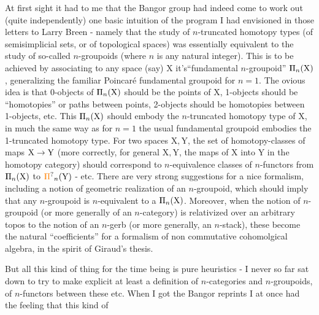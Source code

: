 At first sight it had  to me that the Bangor group had indeed come to work out (quite independently) one basic intuition of the program I had envisioned in those letters to Larry Breen - namely that the study of $n$-truncated homotopy types (of semisimplicial sets, or of topological spaces) was essentially equivalent to the study of so-called $n$-groupoids (where $n$ is any natural integer). This is  to be achieved by associating to any space (say) $\mathrm{X}$ it's``fundamental $n$-groupoid'' $\handwritten{\mathbb{\mathord{\rlap{\kern.23em\vrule height .66em width .035em}\mathrm{\Pi}}}}_{n}(\mathrm{X})$, generalizing the familiar Poincaré fundamental groupoid for $n=1$. The ovious idea is that 0-objects of $\handwritten{\mathbb{\mathord{\rlap{\kern.23em\vrule height .66em width .035em}\mathrm{\Pi}}}}_{n}(\mathrm{X})$ should be the points of $\mathrm{X}$, 1-objects should be ``homotopies'' or paths between points, 2-objects should be homotopies between 1-objects, etc.\unsure{-} This $\handwritten{\mathbb{\mathord{\rlap{\kern.23em\vrule height .66em width .035em}\mathrm{\Pi}}}}_{n}(\mathrm{X})$ should embody the $n$-truncated homotopy type of $\mathrm{X}$, in much the same way as for $n=1$ the usual fundamental groupoid embodies the 1-truncated homotopy type. For two spaces $\mathrm{X},\mathrm{Y}$, the set of homotopy-classes of maps $\mathrm{X}\to\mathrm{Y}$ (more correctly, for general $\mathrm{X},\mathrm{Y}$, the maps of $\mathrm{X}$ into $\mathrm{Y}$ in the homotopy category) should correspond to $n$-equivalence classes of $n$-functors from $\handwritten{\mathbb{\mathord{\rlap{\kern.23em\vrule height .66em width .035em}\mathrm{\Pi}}}}_{n}(\mathrm{X})$ to $\handwritten{\unsure{\mathbb{\mathord{\rlap{\kern.23em\vrule height .66em width .035em}\mathrm{\Pi}}}}}_{n}(\mathrm{Y})$ - etc. There are very stro\unsure{-}ng suggestions for a nice formalism, including a notion of geometric realization of an $n$-groupoid, which should imply that any $n$-groupoid is $n$-equivalent to a $\handwritten{\mathbb{\mathord{\rlap{\kern.23em\vrule height .66em width .035em}\mathrm{\Pi}}}}_{n}(\mathrm{X})$. Moreover, when the notion of $n$-groupoid (or more generally of an $n$-category) is relativized over an arbitrary topos to the notion of an $n$-gerb (or more generally, an $n$-stack), these become the  natural ``coefficients'' for a formalism of non commutative cohomolgical algebra, in the spirit of Giraud's thesis.

But all this kind of thing for the time being is pure heuristics - I never so far sat down to try to make explicit at least a definition of $n$-categories and $n$-groupoids, of $n$-functors between these etc. When I got the Bangor reprints I at once had the feeling that this kind of 
